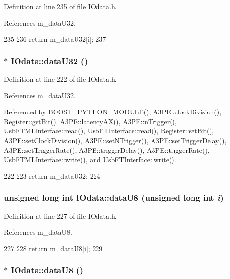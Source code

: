 Definition at line 235 of file IOdata.h.

References m\_\-dataU32.


\begin{DoxyCode}
235                                                 {
236     return m_dataU32[i];
237   }
\end{DoxyCode}
\hypertarget{classIOdata_ab0e3cd09f46c1c3712f797116f6da074}{
\subsubsection[{dataU32}]{$\ast$ IOdata::dataU32 ()}}
\label{classIOdata_ab0e3cd09f46c1c3712f797116f6da074}


Definition at line 222 of file IOdata.h.

References m\_\-dataU32.

Referenced by BOOST\_\-PYTHON\_\-MODULE(), A3PE::clockDivision(), Register::getBit(), A3PE::latencyAX(), A3PE::nTrigger(), UsbFTMLInterface::read(), UsbFTInterface::read(), Register::setBit(), A3PE::setClockDivision(), A3PE::setNTrigger(), A3PE::setTriggerDelay(), A3PE::setTriggerRate(), A3PE::triggerDelay(), A3PE::triggerRate(), UsbFTMLInterface::write(), and UsbFTInterface::write().


\begin{DoxyCode}
222                 {
223     return m_dataU32;
224   }
\end{DoxyCode}
\hypertarget{classIOdata_a9c7cc68c435e1b22dcdac7c17d186e63}{
\subsubsection[{dataU8}]{\setlength{\rightskip}{0pt plus 5cm}unsigned long int IOdata::dataU8 (unsigned long int {\em i})}}
\label{classIOdata_a9c7cc68c435e1b22dcdac7c17d186e63}


Definition at line 227 of file IOdata.h.

References m\_\-dataU8.


\begin{DoxyCode}
227                                                {
228     return m_dataU8[i];
229   }
\end{DoxyCode}
\hypertarget{classIOdata_a75e9c318dbac3a39402179070943d4bc}{
\subsubsection[{dataU8}]{$\ast$ IOdata::dataU8 ()}}
\label{classIOdata_a75e9c318dbac3a39402179070943d4bc}


